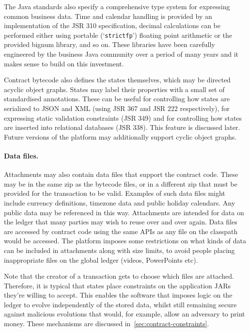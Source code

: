 \documentclass{article}
\begin{document}
The Java standards also specify a comprehensive type system for expressing common business data. Time and calendar
handling is provided by an implementation of the JSR 310 specification, decimal calculations can be performed
either using portable (`\texttt{strictfp}') floating point arithmetic or the provided bignum library, and so on.
These libraries have been carefully engineered by the business Java community over a period of many years and it
makes sense to build on this investment.

Contract bytecode also defines the states themselves, which may be directed acyclic object graphs. States may label
their properties with a small set of standardised annotations. These can be useful for controlling how states are
serialized to JSON and XML (using JSR 367 and JSR 222 respectively), for expressing static validation constraints
(JSR 349) and for controlling how states are inserted into relational databases (JSR 338). This feature is
discussed later. Future versions of the platform may additionally support cyclic object graphs.

\paragraph{Data files.}Attachments may also contain data files that support the contract code. These may be in the
same zip as the bytecode files, or in a different zip that must be provided for the transaction to be valid.
Examples of such data files might include currency definitions, timezone data and public holiday calendars. Any
public data may be referenced in this way. Attachments are intended for data on the ledger that many parties may
wish to reuse over and over again. Data files are accessed by contract code using the same APIs as any file on the
classpath would be accessed. The platform imposes some restrictions on what kinds of data can be included in
attachments along with size limits, to avoid people placing inappropriate files on the global ledger (videos,
PowerPoints etc).

Note that the creator of a transaction gets to choose which files are attached. Therefore, it is typical that
states place constraints on the application JARs they're willing to accept. This enables the software that imposes
logic on the ledger to evolve independently of the stored data, whilst still remaining secure against malicious
evolutions that would, for example, allow an adversary to print money. These mechanisms are discussed
in~\cref{sec:contract-constraints}.
\end{document}
